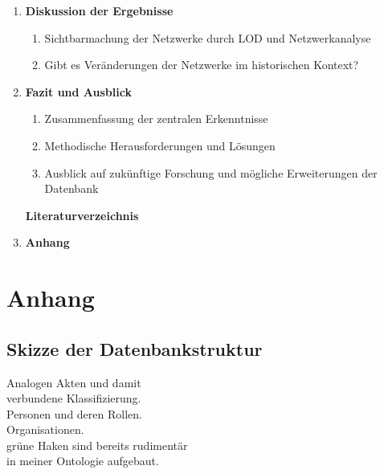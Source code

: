 \documentclass[12pt, a4paper, ngerman, bidi=default]{article}
\begin{document}
\begin{spacing}{1.5}
\begin{enumerate}
    \item \textbf{ Diskussion der Ergebnisse}
    \begin{enumerate}
        \item Sichtbarmachung der Netzwerke durch LOD und Netzwerkanalyse
        \item Gibt es Veränderungen der Netzwerke im historischen Kontext?
    \end{enumerate}
    
    \item \textbf{Fazit und Ausblick}
    \begin{enumerate}
        \item Zusammenfassung der zentralen Erkenntnisse
        \item Methodische Herausforderungen und Lösungen
        \item Ausblick auf zukünftige Forschung und mögliche Erweiterungen der Datenbank
    \end{enumerate}

    \textbf{Literaturverzeichnis}
    
    \item \textbf{Anhang}
    
\end{enumerate}

\newpage
\section{\textbf{Anhang}}
\subsection{Skizze der Datenbankstruktur}
\begin{tcolorbox}[colback=gray!20, colframe=gray!50, width=\dimexpr\textwidth-7cm\relax]
\textcolor{blue}{} Analogen Akten und damit \\
\hspace*{0.5cm}verbundene Klassifizierung.\\
\textcolor{yellow}{} Personen und deren Rollen.\\
\textcolor{orange}{} Organisationen.\\
\textcolor{green}{} grüne Haken sind bereits rudimentär \\\hspace*{0.5cm}in meiner Ontologie aufgebaut.
\end{tcolorbox}
\label{sec:Anhang Datenbankstruktur}
\vspace{1em}


\end{spacing}
\end{document}
